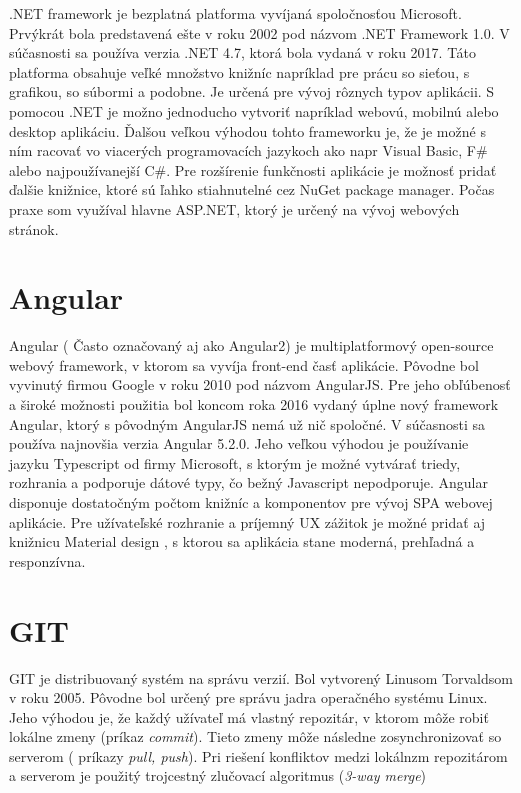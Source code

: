 \documentclass[11pt, oneside]{report}
\begin{document}
.NET framework \cite{net} je bezplatná platforma vyvíjaná spoločnosťou Microsoft. Prvýkrát bola predstavená ešte v roku 2002 pod názvom .NET Framework 1.0. V súčasnosti sa používa verzia .NET 4.7, ktorá bola vydaná v roku 2017. Táto platforma obsahuje veľké množstvo knižníc napríklad pre prácu   so sieťou, s grafikou,  so súbormi a podobne. Je určená pre vývoj rôznych typov aplikácii. S pomocou .NET  je možno jednoducho vytvoriť napríklad webovú, mobilnú alebo desktop aplikáciu. Ďalšou veľkou výhodou tohto frameworku je, že je možné  s ním racovať vo viacerých programovacích jazykoch ako napr Visual Basic, F\# alebo najpoužívanejší C\#. Pre rozšírenie funkčnosti aplikácie je možnosť pridať ďalšie knižnice, ktoré sú ľahko stiahnutelné cez NuGet package manager. Počas praxe som využíval hlavne ASP.NET, ktorý je určený na vývoj webových stránok.

\section{Angular}
Angular\cite{angular} ( Často označovaný aj ako Angular2) je multiplatformový  open-source webový framework, v ktorom sa vyvíja front-end časť aplikácie. Pôvodne bol vyvinutý firmou Google v roku 2010 pod názvom AngularJS. Pre jeho obľúbenosť a široké  možnosti použitia bol koncom roka 2016 vydaný úplne nový framework Angular, ktorý s pôvodným AngularJS nemá už nič spoločné. V súčasnosti sa používa najnovšia verzia Angular 5.2.0.
Jeho veľkou výhodou je používanie jazyku Typescript od firmy Microsoft,  s ktorým je možné vytvárať triedy, rozhrania a podporuje dátové typy, čo bežný Javascript nepodporuje. Angular disponuje dostatočným počtom knižníc a komponentov pre vývoj  SPA webovej aplikácie. Pre užívateľské rozhranie a príjemný UX zážitok je možné pridať aj knižnicu Material design \cite{material}, s ktorou  sa aplikácia stane moderná, prehľadná a responzívna.

\section{GIT}
GIT\cite{git} je distribuovaný systém na správu verzií. Bol vytvorený Linusom Torvaldsom v roku 2005. Pôvodne bol určený pre správu jadra operačného systému Linux. Jeho výhodou je, že každý užívateľ má vlastný repozitár, v ktorom môže robiť lokálne zmeny (príkaz \textit{commit}). Tieto zmeny môže následne zosynchronizovať  so serverom ( príkazy \textit{ pull, push}). Pri riešení konfliktov medzi lokálnzm repozitárom a serverom je použitý trojcestný zlučovací algoritmus (\textit{3-way merge}) 
\end{document}
